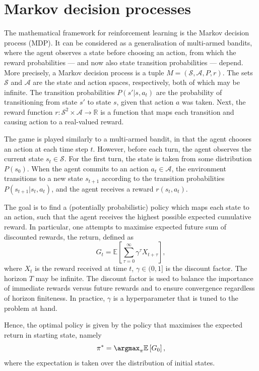 \section{Markov decision processes}
The mathematical framework for reinforcement learning is the Markov decision process (MDP).
It can be considered as a generalisation of multi-armed bandits, where the agent observes a state before choosing an action, from which the reward probabilities — and now also state transition probabilities — depend.
More precisely, a Markov decision process is a tuple $M = (\mathcal{S}, \mathcal{A}, P, r)$.
The sets $\mathcal{S}$ and $\mathcal{A}$ are the state and action spaces, respectively, both of which may be infinite.
The transition probabilities $P(s' | s, a_t)$ are the probability of transitioning from state $s'$ to state $s$, given that action $a$ was taken.
Next, the reward function $r : \mathcal{S}^2 \times \mathcal{A} \to \mathbb{R}$ is a function that maps each transition and causing action to a real-valued reward.

The game is played similarly to a multi-armed bandit, in that the agent chooses an action at each time step $t$.
However, before each turn, the agent observes the current state $s_t \in \mathcal{S}$.
For the first turn, the state is taken from some distribution $P(s_0)$.
When the agent commits to an action $a_t \in \mathcal{A}$, the environment transitions to a new state $s_{t+1}$ according to the transition probabilities $P(s_{t+1} | s_t, a_t)$, and the agent receives a reward $r(s_t, a_t)$.

The goal is to find a (potentially probabilistic) policy which maps each state to an action, such that the agent receives the highest possible expected cumulative reward.
In particular, one attempts to maximise expected future sum of discounted rewards, the return, defined as
\begin{equation}
    G_t = \mathbb{E} \left[ \sum_{\tau=0}^{\infty} \gamma^\tau X_{t+\tau} \right],
\end{equation}
where $X_t$ is the reward received at time $t$, $\gamma \in (0,1]$ is the discount factor.
The horizon $T$ may be infinite.
The discount factor is used to balance the importance of immediate rewards versus future rewards and to ensure convergence regardless of horizon finiteness.
In practice, $\gamma$ is a hyperparameter that is tuned to the problem at hand.

Hence, the optimal policy is given by the policy that maximises the expected return in starting state, namely
\begin{equation}
    \pi^* = \argmax_{\pi} \mathbb{E} \left[ G_0 \right],
\end{equation}
where the expectation is taken over the distribution of initial states.

